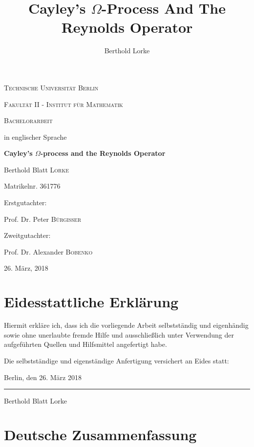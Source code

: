 \documentclass[a4paper]{article}
\title{Cayley's $\Omega$-Process And The Reynolds Operator}
\author{Berthold Lorke}
\theoremstyle{prrt}
\begin{document}


\begin{titlepage}
  \centering
  {\scshape\LARGE Technische Universit\"at Berlin\par}
  \vspace{0.5cm}
  {\scshape\LARGE Fakult\"at II - Institut f\"ur Mathematik\par}
  \vspace{1cm}
  {\scshape\Large Bachelorarbeit\par}
  \vspace{0.5cm}
  {in englischer Sprache\par}
  \vspace{1.5cm}
  {\huge\bfseries Cayley's $\Omega$-process and the Reynolds Operator\par}
  \vspace{2cm}
  {\Large Berthold Blatt \textsc{Lorke}\par}
  {\Large Matrikelnr. 361776\par}
  \vfill
  Erstgutachter:\par
  Prof. Dr. Peter \textsc{B\"urgisser}\par
  Zweitgutachter:\par
  Prof. Dr. Alexander \textsc{Bobenko}\par
  \vfill

  {\large 26. M\"arz, 2018 \par}
\end{titlepage}

\section*{Eidesstattliche Erkl\"arung}

Hiermit erkl\"are ich, dass ich die vorliegende Arbeit selbstst\"andig und eigenh\"andig sowie ohne unerlaubte fremde Hilfe und ausschlie{\ss}lich unter Verwendung der aufgef\"uhrten Quellen und Hilfsmittel angefertigt habe.

\vspace{4cm}
\noindent Die selbstst\"andige und eigenst\"andige Anfertigung versichert an Eides statt:

\vspace{2cm}
\noindent Berlin, den 26. M\"arz 2018

\vspace{1cm}
\noindent \rule{5cm}{0.4pt}

\noindent Berthold Blatt Lorke
\newpage
\section*{Deutsche Zusammenfassung}
\end{document}
